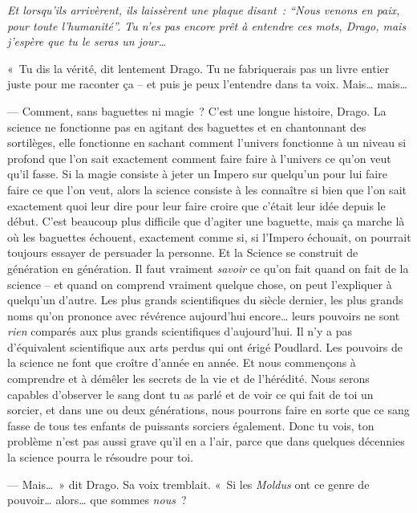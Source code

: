 \emph{Et lorsqu'ils arrivèrent, ils laissèrent une plaque disant~: “Nous venons en paix, pour toute l'humanité”. Tu n'es pas encore prêt à entendre ces mots, Drago, mais j'espère que tu le seras un jour…}

«~Tu dis la vérité, dit lentement Drago. Tu ne fabriquerais pas un livre entier juste pour me raconter ça -- et puis je peux l'entendre dans ta voix. Mais… mais…

--- Comment, sans baguettes ni magie~? C'est une longue histoire, Drago. La science ne fonctionne pas en agitant des baguettes et en chantonnant des sortilèges, elle fonctionne en sachant comment l'univers fonctionne à un niveau si profond que l'on sait exactement comment faire faire à l'univers ce qu'on veut qu'il fasse. Si la magie consiste à jeter un Impero sur quelqu'un pour lui faire faire ce que l'on veut, alors la science consiste à les connaître si bien que l'on sait exactement quoi leur dire pour leur faire croire que c'était leur idée depuis le début. C'est beaucoup plus difficile que d'agiter une baguette, mais ça marche là où les baguettes échouent, exactement comme si, si l'Impero échouait, on pourrait toujours essayer de persuader la personne. Et la Science se construit de génération en génération. Il faut vraiment \emph{savoir} ce qu'on fait quand on fait de la science -- et quand on comprend vraiment quelque chose, on peut l'expliquer à quelqu'un d'autre. Les plus grands scientifiques du siècle dernier, les plus grands noms qu'on prononce avec révérence aujourd'hui encore… leurs pouvoirs ne sont \emph{rien} comparés aux plus grands scientifiques d'aujourd'hui. Il n'y a pas d'équivalent scientifique aux arts perdus qui ont érigé Poudlard. Les pouvoirs de la science ne font que croître d'année en année. Et nous commençons à comprendre et à démêler les secrets de la vie et de l'hérédité. Nous serons capables d'observer le sang dont tu as parlé et de voir ce qui fait de toi un sorcier, et dans une ou deux générations, nous pourrons faire en sorte que ce sang fasse de tous tes enfants de puissants sorciers également. Donc tu vois, ton problème n'est pas aussi grave qu'il en a l'air, parce que dans quelques décennies la science pourra le résoudre pour toi.

--- Mais…~» dit Drago. Sa voix tremblait. «~Si les \emph{Moldus} ont ce genre de pouvoir… alors… que sommes \emph{nous}~?

